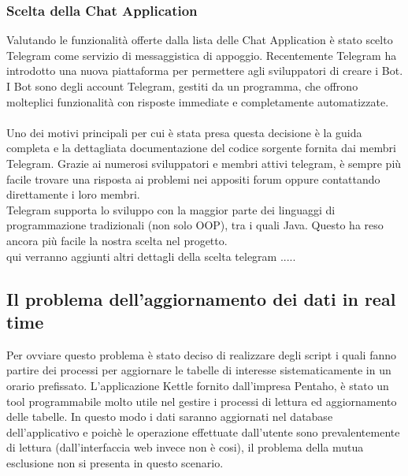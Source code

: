 \subsubsection{Scelta della Chat Application}
Valutando le funzionalità offerte dalla lista delle Chat Application è stato scelto Telegram come servizio di messaggistica di appoggio. Recentemente Telegram ha introdotto una nuova piattaforma per permettere agli sviluppatori di creare i Bot. I Bot sono degli account Telegram, gestiti da un programma, che offrono molteplici funzionalità con risposte immediate e completamente automatizzate. \\\\
Uno dei motivi principali per cui è stata presa questa decisione è la guida completa e la dettagliata documentazione del codice sorgente fornita dai membri Telegram. Grazie ai numerosi sviluppatori e membri attivi telegram, è sempre più facile trovare una risposta ai problemi nei appositi forum oppure contattando direttamente i loro membri.\\ Telegram supporta lo sviluppo con la maggior parte dei linguaggi di programmazione tradizionali (non solo OOP), tra i quali Java. Questo ha reso ancora più facile la nostra scelta nel progetto. \\

qui verranno aggiunti altri dettagli della scelta telegram .....


\subsection{Il problema dell'aggiornamento dei dati in real time}

Per ovviare questo problema è stato deciso di realizzare degli script i quali fanno partire dei processi per aggiornare le tabelle di interesse sistematicamente in un orario prefissato. L'applicazione Kettle fornito dall'impresa Pentaho, è stato un tool programmabile molto utile nel gestire i processi di lettura ed aggiornamento delle tabelle. In questo modo i dati saranno aggiornati nel database dell'applicativo e poichè le operazione effettuate dall'utente sono prevalentemente di lettura (dall'interfaccia web invece non è cosi), il problema della mutua esclusione  non si presenta in questo scenario. 

